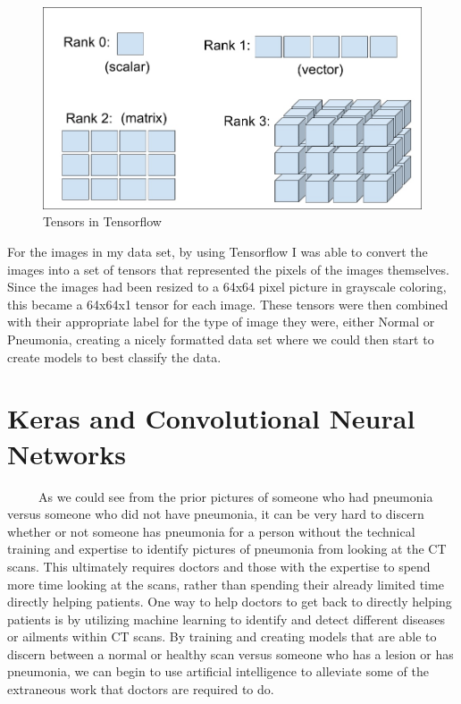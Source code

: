 \documentclass[12pt]{article}
\begin{document}
\begin{figure}

{\centering \includegraphics[width=0.75\linewidth,height=0.25\textheight]{images/tensors} 

}

\caption{Tensors in Tensorflow}\label{fig:sample-fig3}
\end{figure}

For the images in my data set, by using Tensorflow I was able to convert
the images into a set of tensors that represented the pixels of the
images themselves. Since the images had been resized to a 64x64 pixel
picture in grayscale coloring, this became a 64x64x1 tensor for each
image. These tensors were then combined with their appropriate label for
the type of image they were, either Normal or Pneumonia, creating a
nicely formatted data set where we could then start to create models to
best classify the data.

\hypertarget{keras-and-convolutional-neural-networks}{%
\section{Keras and Convolutional Neural
Networks}\label{keras-and-convolutional-neural-networks}}

~~~~~As we could see from the prior pictures of someone who had
pneumonia versus someone who did not have pneumonia, it can be very hard
to discern whether or not someone has pneumonia for a person without the
technical training and expertise to identify pictures of pneumonia from
looking at the CT scans. This ultimately requires doctors and those with
the expertise to spend more time looking at the scans, rather than
spending their already limited time directly helping patients. One way
to help doctors to get back to directly helping patients is by utilizing
machine learning to identify and detect different diseases or ailments
within CT scans. By training and creating models that are able to
discern between a normal or healthy scan versus someone who has a lesion
or has pneumonia, we can begin to use artificial intelligence to
alleviate some of the extraneous work that doctors are required to do.
\end{document}
